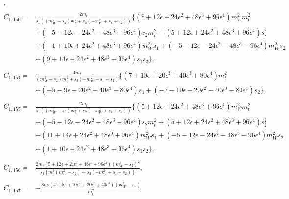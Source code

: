\documentclass[twocolumn,aps,showpacs,nofootinbib,superscriptaddress,prd]{revtex4-2}
\begin{document}
\begin{widetext}
\begin{align}
,\nonumber\\
\nonumber\\
C_{1,150}=&\frac{2m_t}{s_1\left(\left(m_W^2-s_2\right)m_t^2+s_2\left(-m_W^2+s_1+s_2\right)\right)}\{\left(5 +12 \epsilon +24 \epsilon^2 +48 \epsilon^3 +96 \epsilon^4\right)m_W^2m_t^2
\nonumber\\&
+\left(-5 -12 \epsilon -24 \epsilon^2 -48 \epsilon^3 -96 \epsilon^4\right)s_2m_t^2+\left(5 +12 \epsilon +24 \epsilon^2 +48 \epsilon^3 +96 \epsilon^4\right)s_2^2
\nonumber\\&
+\left(-1 +10 \epsilon +24 \epsilon^2 +48 \epsilon^3 +96 \epsilon^4\right)m_W^2s_1+\left(-5 -12 \epsilon -24 \epsilon^2 -48 \epsilon^3 -96 \epsilon^4\right)m_W^2s_2
\nonumber\\&
+\left(9 +14 \epsilon +24 \epsilon^2 +48 \epsilon^3 +96 \epsilon^4\right)s_1s_2\}
,\nonumber\\
\nonumber\\
C_{1,151}=&\frac{4m_t}{\left(m_W^2-s_2\right)m_t^2+s_2\left(-m_W^2+s_1+s_2\right)}\{\left(7 +10 \epsilon +20 \epsilon^2 +40 \epsilon^3 +80 \epsilon^4\right)m_t^2
\nonumber\\&
+\left(-5 -9 \epsilon -20 \epsilon^2 -40 \epsilon^3 -80 \epsilon^4\right)s_1+\left(-7 -10 \epsilon -20 \epsilon^2 -40 \epsilon^3 -80 \epsilon^4\right)s_2\}
,\nonumber\\
\nonumber\\
C_{1,155}=&\frac{2m_t}{s_1\left(\left(m_W^2-s_2\right)m_t^2+s_2\left(-m_W^2+s_1+s_2\right)\right)}\{\left(5 +12 \epsilon +24 \epsilon^2 +48 \epsilon^3 +96 \epsilon^4\right)m_W^2m_t^2
\nonumber\\&
+\left(-5 -12 \epsilon -24 \epsilon^2 -48 \epsilon^3 -96 \epsilon^4\right)s_2m_t^2+\left(5 +12 \epsilon +24 \epsilon^2 +48 \epsilon^3 +96 \epsilon^4\right)s_2^2
\nonumber\\&
+\left(11 +14 \epsilon +24 \epsilon^2 +48 \epsilon^3 +96 \epsilon^4\right)m_W^2s_1+\left(-5 -12 \epsilon -24 \epsilon^2 -48 \epsilon^3 -96 \epsilon^4\right)m_W^2s_2
\nonumber\\&
+\left(1 +10 \epsilon +24 \epsilon^2 +48 \epsilon^3 +96 \epsilon^4\right)s_1s_2\}
,\nonumber\\
\nonumber\\
C_{1,156}=&\frac{2m_t\left(5 +12 \epsilon +24 \epsilon^2 +48 \epsilon^3 +96 \epsilon^4\right)\left(m_W^2-s_2\right)^2}{s_1\left(m_t^2
\left(m_W^2-s_2\right)+s_2\left(-m_W^2+s_1+s_2\right)\right)}
,\nonumber\\
\nonumber\\
C_{1,157}=&-\frac{8m_t\left(4 +5 \epsilon +10 \epsilon^2 +20 \epsilon^3 +40 \epsilon^4\right)\left(m_W^2-s_2\right)}{m_t^2
}
\end{align}
\end{widetext}
\end{document}
